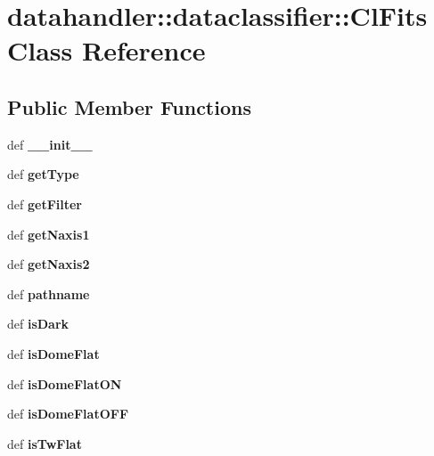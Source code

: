 \section{datahandler::dataclassifier::Cl\-Fits Class Reference}
\label{classdatahandler_1_1dataclassifier_1_1ClFits}
\subsection*{Public Member Functions}
\begin{CompactItemize}
\item 
def {\bf\_\-\_\-init\_\-\_\-}
\item 
def \textbf{get\-Type}\label{classdatahandler_1_1dataclassifier_1_1ClFits_7278b70a07d9dc28f0dfe4e9a4967c23}

\item 
def \textbf{get\-Filter}\label{classdatahandler_1_1dataclassifier_1_1ClFits_4f5e047838b11d0ac46846c573fa907f}

\item 
def \textbf{get\-Naxis1}\label{classdatahandler_1_1dataclassifier_1_1ClFits_abca34cc3cd887a6c20db173a88c3bb4}

\item 
def \textbf{get\-Naxis2}\label{classdatahandler_1_1dataclassifier_1_1ClFits_1c9023ba36e050f59eaa7c5e336f6409}

\item 
def \textbf{pathname}\label{classdatahandler_1_1dataclassifier_1_1ClFits_4bd3ac0f94170bad2743b7cfd15810f0}

\item 
def \textbf{is\-Dark}\label{classdatahandler_1_1dataclassifier_1_1ClFits_1f58ad19463a9310395d0102188719c2}

\item 
def \textbf{is\-Dome\-Flat}\label{classdatahandler_1_1dataclassifier_1_1ClFits_1d92f1ce77dd18820e9e6242e7eab6fa}

\item 
def \textbf{is\-Dome\-Flat\-ON}\label{classdatahandler_1_1dataclassifier_1_1ClFits_c8b86efb6de000b6053736efdc0c1b51}

\item 
def \textbf{is\-Dome\-Flat\-OFF}\label{classdatahandler_1_1dataclassifier_1_1ClFits_ebc0d5a45d0adfa3c1212d310166e9fc}

\item 
def \textbf{is\-Tw\-Flat}\label{classdatahandler_1_1dataclassifier_1_1ClFits_2ed97a7a20f9fa6f7b977e92a22c486b}


\end{CompactItemize}
